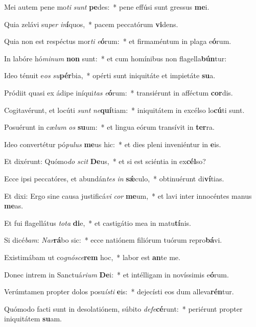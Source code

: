 \item Mei autem pene mo\textit{ti} \textit{sunt} \textbf{pe}des:~* pene effúsi sunt gressus \textbf{me}i.
\item Quia zelávi su\textit{per} \textit{in}\textbf{í}quos,~* pacem peccatórum \textbf{vi}dens.
\item Quia non est respéctus mor\textit{ti} \textit{e}\textbf{ó}rum:~* et firmaméntum in plaga e\textbf{ó}rum.
\item In labóre hó\textit{mi}\textit{num} \textbf{non} sunt:~* et cum homínibus non flagella\textbf{bún}tur:
\item Ideo ténuit e\textit{os} \textit{su}\textbf{pér}bia,~* opérti sunt iniquitáte et impietáte \textbf{su}a.
\item Pródiit quasi ex ádipe iníqui\textit{tas} \textit{e}\textbf{ó}rum:~* transiérunt in afféctum \textbf{cor}dis.
\item Cogitavérunt, et locúti \textit{sunt} \textit{ne}\textbf{quí}tiam:~* iniquitátem in excélso lo\textbf{cú}ti sunt.
\item Posuérunt in cæ\textit{lum} \textit{os} \textbf{su}um:~* et lingua eórum transívit in \textbf{ter}ra.
\item Ideo convertétur pó\textit{pu}\textit{lus} \textbf{me}us hic:~* et dies pleni inveniéntur in \textbf{e}is.
\item Et dixérunt: Quómo\textit{do} \textit{scit} \textbf{De}us,~* et si est sciéntia in ex\textbf{cél}so?
\item Ecce ipsi peccatóres, et abundán\textit{tes} \textit{in} \textbf{sǽ}culo,~* obtinuérunt di\textbf{ví}tias.
\item Et dixi: Ergo sine causa justificá\textit{vi} \textit{cor} \textbf{me}um,~* et lavi inter innocéntes manus \textbf{me}as.
\item Et fui flagellátus \textit{to}\textit{ta} \textbf{di}e,~* et castigátio mea in matu\textbf{tí}nis.
\item Si dicé\textit{bam}: \textit{Nar}\textbf{rá}bo sic:~* ecce natiónem filiórum tuórum repro\textbf{bá}vi.
\item Existimábam ut co\textit{gnó}\textit{sce}\textbf{rem} hoc,~* labor est \textbf{an}te me.
\item Donec intrem in Sanctuá\textit{ri}\textit{um} \textbf{De}i:~* et intélligam in novíssimis e\textbf{ó}rum.
\item Verúmtamen propter dolos posu\textit{ís}\textit{ti} \textbf{e}is:~* dejecísti eos dum alleva\textbf{rén}tur.
\item Quómodo facti sunt in desolatiónem, súbito \textit{de}\textit{fe}\textbf{cé}runt:~* periérunt propter iniquitátem \textbf{su}am.
